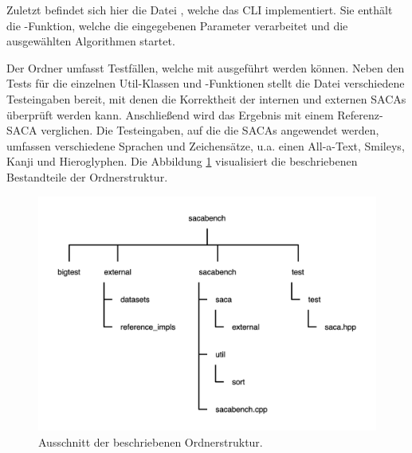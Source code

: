 Zuletzt befindet sich hier die Datei , welche das CLI implementiert. 
Sie enthält die -Funktion, welche die eingegebenen Parameter verarbeitet und die ausgewählten Algorithmen startet.\par
Der Ordner  umfasst Testfällen, welche mit  ausgeführt werden können. 
Neben den Tests für die einzelnen Util-Klassen und -Funktionen stellt die Datei  verschiedene Testeingaben bereit, mit denen die Korrektheit der internen und externen SACAs überprüft werden kann. 
Anschließend wird das Ergebnis mit einem Referenz-SACA verglichen. 
Die Testeingaben, auf die die SACAs angewendet werden, umfassen verschiedene Sprachen und Zeichensätze, u.a. einen All-a-Text, Smileys, Kanji und Hieroglyphen.
Die Abbildung \ref{ordner_struktur} visualisiert die beschriebenen Bestandteile der Ordnerstruktur.

\begin{figure}[t!]
\centering
\includegraphics[width=\textwidth]{kapitel/3_framework/code_structure/ordner_struktur}
\caption[Ausschnitt der beschriebenen Ordnerstruktur.]{Ausschnitt der beschriebenen Ordnerstruktur.}
\label{ordner_struktur}
\end{figure}
